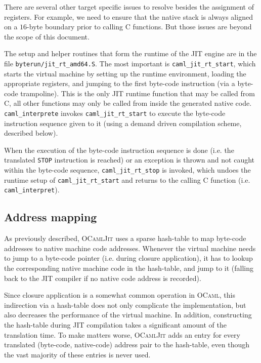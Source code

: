 \documentclass[10pt,a4paper,twocolumn]{article}
\begin{document}
There are several other target specific issues to resolve besides the assignment of registers. For example,
we need to ensure that the native stack is always aligned on a $16$-byte boundary prior to calling C functions.
But those issues are beyond the scope of this document.

The setup and helper routines that form the runtime of the JIT engine are in the file
\texttt{byterun/jit\_rt\_amd64.S}. The most important is \texttt{caml\_jit\_rt\_start}, which
starts the virtual machine by setting up the runtime environment, loading the appropriate registers,
and jumping to the first byte-code instruction (via a byte-code trampoline). This is the only
JIT runtime function that may be called from C, all other functions may only be
called from inside the generated native code. \texttt{caml\_interprete} invokes \texttt{caml\_jit\_rt\_start}
to execute the byte-code instruction sequence given to it (using a demand driven compilation
scheme, described below).

When the execution of the byte-code instruction sequence is done (i.e. the translated \texttt{STOP}
instruction is reached) or an exception is thrown and not caught within the byte-code sequence,
\texttt{caml\_jit\_rt\_stop} is invoked, which undoes the runtime setup of \texttt{caml\_jit\_rt\_start}
and returns to the calling C function (i.e. \texttt{caml\_interpret}).

\subsection{Address mapping} \label{subsection:Address_mapping}

As previously described, \textsc{OCamlJit} uses a sparse hash-table to map byte-code addresses to
native machine code addresses.
Whenever the virtual machine needs to jump to a byte-code pointer (i.e. during closure application),
it has to lookup the corresponding native machine code in the hash-table, and jump to it (falling back
to the JIT compiler if no native code address is recorded).

Since closure application is a somewhat common operation in \textsc{OCaml}, this indirection via a
hash-table does not only complicate the implementation, but also decreases the performance of the
virtual machine. In addition, constructing the hash-table during JIT compilation takes a significant
amount of the translation time. To make matters worse, \textsc{OCamlJit} adds an entry for every
translated (byte-code, native-code) address pair to the hash-table, even though the vast majority
of these entries is never used.
\end{document}

